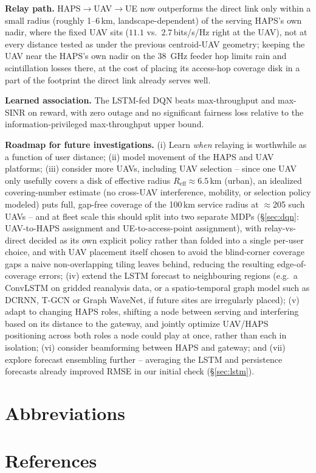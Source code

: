 \documentclass[]{ieeeaccess}
\begin{document}
\textbf{Relay path.} HAPS$\to$UAV$\to$UE now outperforms the direct link only within a small radius (roughly 1--6\,km, landscape-dependent) of the serving HAPS's own nadir, where the fixed UAV sits ($11.1$ vs.\ $2.7$\,bits/s/Hz right at the UAV), not at every distance tested as under the previous centroid-UAV geometry; keeping the UAV near the HAPS's own nadir on the 38~GHz feeder hop limits rain and scintillation losses there, at the cost of placing its access-hop coverage disk in a part of the footprint the direct link already serves well.

\textbf{Learned association.} The LSTM-fed DQN beats max-throughput and max-SINR on reward, with zero outage and no significant fairness loss relative to the information-privileged max-throughput upper bound.

\textbf{Roadmap for future investigations.} (i) Learn \emph{when} relaying is worthwhile as a function of user distance; (ii) model movement of the HAPS and UAV platforms; (iii) consider more UAVs, including UAV selection -- since one UAV only usefully covers a disk of effective radius $R_\mathrm{eff}\approx6.5$\,km (urban), an idealized covering-number estimate (no cross-UAV interference, mobility, or selection policy modeled) puts full, gap-free coverage of the 100\,km service radius at $\approx$205 such UAVs -- and at fleet scale this should split into two separate MDPs (\S\ref{sec:dqn}: UAV-to-HAPS assignment and UE-to-access-point assignment), with relay-vs-direct decided as its own explicit policy rather than folded into a single per-user choice, and with UAV placement itself chosen to avoid the blind-corner coverage gaps a naive non-overlapping tiling leaves behind, reducing the resulting edge-of-coverage errors; (iv) extend the LSTM forecast to neighbouring regions (e.g.\ a ConvLSTM on gridded reanalysis data, or a spatio-temporal graph model such as DCRNN, T-GCN or Graph WaveNet, if future sites are irregularly placed); (v) adapt to changing HAPS roles, shifting a node between serving and interfering based on its distance to the gateway, and jointly optimize UAV/HAPS positioning across both roles a node could play at once, rather than each in isolation; (vi) consider beamforming between HAPS and gateway; and (vii) explore forecast ensembling further -- averaging the LSTM and persistence forecasts already improved RMSE in our initial check (\S\ref{sec:lstm}).

\section{Abbreviations}


\section{References}


\EOD
\end{document}
